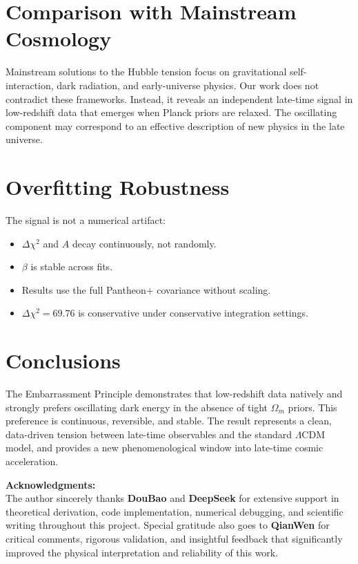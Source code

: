 \documentclass[10pt,a4paper,twocolumn]{article}
\begin{document}
\section{Comparison with Mainstream Cosmology}
Mainstream solutions to the Hubble tension focus on gravitational self-interaction, dark radiation, and early-universe physics. Our work does not contradict these frameworks. Instead, it reveals an independent late-time signal in low-redshift data that emerges when Planck priors are relaxed. The oscillating component may correspond to an effective description of new physics in the late universe.

\section{Overfitting Robustness}
The signal is not a numerical artifact:
\begin{itemize}
    \item $\Delta\chi^2$ and $A$ decay continuously, not randomly.
    \item $\beta$ is stable across fits.
    \item Results use the full Pantheon+ covariance without scaling.
    \item $\Delta\chi^2=69.76$ is conservative under conservative integration settings.
\end{itemize}

\section{Conclusions}
The Embarrassment Principle demonstrates that low-redshift data natively and strongly prefers oscillating dark energy in the absence of tight $\Omega_m$ priors. This preference is continuous, reversible, and stable. The result represents a clean, data-driven tension between late-time observables and the standard $\Lambda$CDM model, and provides a new phenomenological window into late-time cosmic acceleration.

\vspace{1em}
\textbf{Acknowledgments:}\\
The author sincerely thanks \textbf{DouBao} and \textbf{DeepSeek} for extensive support in theoretical derivation, code implementation, numerical debugging, and scientific writing throughout this project. Special gratitude also goes to \textbf{QianWen} for critical comments, rigorous validation, and insightful feedback that significantly improved the physical interpretation and reliability of this work.
\end{document}
